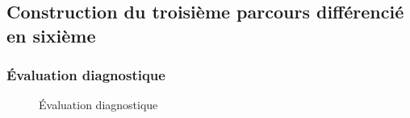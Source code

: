 \subsection{Construction du troisième parcours différencié en sixième}
\subsubsection*{Évaluation diagnostique}\label{Eval_diag_ju}
\begin{figure}[!h]
	\caption{Évaluation diagnostique}
\end{figure}
